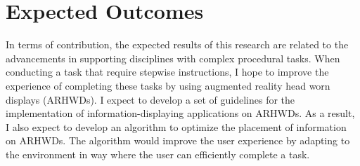 \section{Expected Outcomes}
\label{sec:expectedoutcomes}

In terms of contribution, the expected results of this research are related to the advancements in supporting disciplines with complex procedural tasks. When conducting a task that require stepwise instructions, I hope to improve the experience of completing these tasks by using augmented reality head worn displays (ARHWDs). I expect to develop a set of guidelines for the implementation of information-displaying applications on ARHWDs. As a result, I also expect to develop an algorithm to optimize the placement of information on ARHWDs. The algorithm would improve the user experience by adapting to the environment in way where the user can efficiently complete a task.